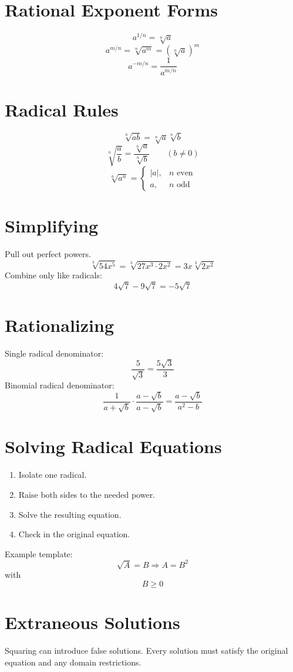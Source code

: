 \documentclass[11pt]{article}
\begin{document}

\section*{Rational Exponent Forms}
\[
a^{1/n}=\sqrt[n]{a}
\]
\[
a^{m/n}=\sqrt[n]{a^m}=(\sqrt[n]{a})^m
\]
\[
a^{-m/n}=\frac{1}{a^{m/n}}
\]

\section*{Radical Rules}
\[
\sqrt[n]{ab}=\sqrt[n]{a}\sqrt[n]{b}
\]
\[
\sqrt[n]{\frac ab}=\frac{\sqrt[n]{a}}{\sqrt[n]{b}}\qquad (b\ne0)
\]
\[
\sqrt[n]{a^n}=
\begin{cases}
|a|, & n\text{ even}\\
a, & n\text{ odd}
\end{cases}
\]

\section*{Simplifying}
Pull out perfect powers.
\[
\sqrt[3]{54x^5}=\sqrt[3]{27x^3\cdot2x^2}=3x\sqrt[3]{2x^2}
\]
Combine only like radicals:
\[
4\sqrt7-9\sqrt7=-5\sqrt7
\]

\section*{Rationalizing}
Single radical denominator:
\[
\frac{5}{\sqrt3}=\frac{5\sqrt3}{3}
\]
Binomial radical denominator:
\[
\frac{1}{a+\sqrt b}\cdot\frac{a-\sqrt b}{a-\sqrt b}
=\frac{a-\sqrt b}{a^2-b}
\]

\section*{Solving Radical Equations}
\begin{enumerate}
  \item Isolate one radical.
  \item Raise both sides to the needed power.
  \item Solve the resulting equation.
  \item Check in the original equation.
\end{enumerate}
Example template:
\[
\sqrt{A}=B\Rightarrow A=B^2
\]
with
\[
B\ge0
\]

\section*{Extraneous Solutions}
Squaring can introduce false solutions. Every solution must satisfy the original equation and any domain restrictions.
\end{document}
